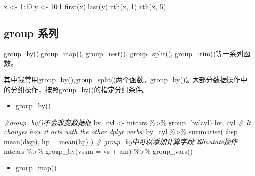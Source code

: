 \documentclass[
]{book}
\newenvironment{Shaded}{\begin{snugshade}}{\end{snugshade}}
\newcommand{\AttributeTok}[1]{\textcolor[rgb]{0.77,0.63,0.00}{#1}}
\newcommand{\CommentTok}[1]{\textcolor[rgb]{0.56,0.35,0.01}{\textit{#1}}}
\newcommand{\DecValTok}[1]{\textcolor[rgb]{0.00,0.00,0.81}{#1}}
\newcommand{\FunctionTok}[1]{\textcolor[rgb]{0.00,0.00,0.00}{#1}}
\newcommand{\NormalTok}[1]{#1}
\newcommand{\OtherTok}[1]{\textcolor[rgb]{0.56,0.35,0.01}{#1}}
\newcommand{\SpecialCharTok}[1]{\textcolor[rgb]{0.00,0.00,0.00}{#1}}
\providecommand{\tightlist}{%
  \setlength{\itemsep}{0pt}\setlength{\parskip}{0pt}}
\begin{document}
\begin{Shaded}
\begin{Highlighting}[]
\NormalTok{x }\OtherTok{\textless{}{-}} \DecValTok{1}\SpecialCharTok{:}\DecValTok{10}
\NormalTok{y }\OtherTok{\textless{}{-}} \DecValTok{10}\SpecialCharTok{:}\DecValTok{1}
\FunctionTok{first}\NormalTok{(x)}
\FunctionTok{last}\NormalTok{(y)}
\FunctionTok{nth}\NormalTok{(x, }\DecValTok{1}\NormalTok{)}
\FunctionTok{nth}\NormalTok{(x, }\DecValTok{5}\NormalTok{)}
\end{Highlighting}
\end{Shaded}

\hypertarget{group-ux7cfbux5217}{%
\subsection{group 系列}\label{group-ux7cfbux5217}}

group\_by(),group\_map(), group\_nest(), group\_split(), group\_trim()等一系列函数。

其中我常用group\_by(),group\_split()两个函数。group\_by()是大部分数据操作中的分组操作，按照group\_by()的指定分组条件。

\begin{itemize}
\tightlist
\item
  group\_by()
\end{itemize}

\begin{Shaded}
\begin{Highlighting}[]
\CommentTok{\#group\_by()不会改变数据框}
\NormalTok{by\_cyl }\OtherTok{\textless{}{-}}\NormalTok{ mtcars }\SpecialCharTok{\%\textgreater{}\%} \FunctionTok{group\_by}\NormalTok{(cyl)}
\NormalTok{by\_cyl}
\CommentTok{\# It changes how it acts with the other dplyr verbs:}
\NormalTok{by\_cyl }\SpecialCharTok{\%\textgreater{}\%} \FunctionTok{summarise}\NormalTok{(}
  \AttributeTok{disp =} \FunctionTok{mean}\NormalTok{(disp),}
  \AttributeTok{hp =} \FunctionTok{mean}\NormalTok{(hp)}
\NormalTok{)}
\CommentTok{\# group\_by中可以添加计算字段 即mutate操作}
\NormalTok{mtcars }\SpecialCharTok{\%\textgreater{}\%} \FunctionTok{group\_by}\NormalTok{(}\AttributeTok{vsam =}\NormalTok{ vs }\SpecialCharTok{+}\NormalTok{ am) }\SpecialCharTok{\%\textgreater{}\%}
  \FunctionTok{group\_vars}\NormalTok{()}
\end{Highlighting}
\end{Shaded}

\begin{itemize}
\tightlist
\item
  group\_map()
\end{itemize}
\end{document}
